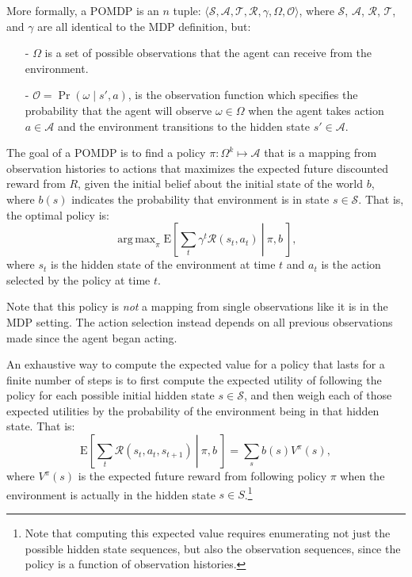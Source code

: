 \documentclass[11pt]{article}
\DeclareMathOperator*{\argmax}{arg\,max}
\begin{document}
More formally, a POMDP is an $n$ tuple: $\langle \mathcal{S},\mathcal{A},\mathcal{T},\mathcal{R}, \gamma, \Omega,\mathcal{O} \rangle$, where $\mathcal{S}$, $\mathcal{A}$, $\mathcal{R}$, $\mathcal{T}$, and $\gamma$ are all identical to the MDP definition, but:
\begin{itemize}
\item[-] $\Omega$ is a set of possible observations that the agent can receive from the environment.
\item[-] $\mathcal{O} = \Pr(\omega \mid s', a)$, is the observation function which specifies the probability that the agent will observe $\omega \in \Omega$ when the agent takes action $a \in \mathcal{A}$ and the environment transitions to the hidden state $s' \in \mathcal{A}$.
\end{itemize}

The goal of a POMDP is to find a policy $\pi : \Omega^k \mapsto \mathcal{A}$ that is a mapping from observation histories to actions that maximizes the expected future discounted reward from $R$, given the initial belief about the initial state of the world $b$, where $b(s)$ indicates the probability that environment is in state $s \in \mathcal{S}$. That is, the optimal policy is:
\begin{equation}
\argmax_\pi \left.\text{E}\left[\sum_t \gamma^t \mathcal{R}(s_t,a_t)\ \right|\ \pi, b\ \right],
\end{equation}
where $s_t$ is the hidden state of the environment at time $t$ and $a_t$ is the action selected by the policy at time $t$. 

Note that this policy is {\em not} a mapping from single observations like it is in the MDP setting. The action selection instead depends on all previous observations made since the agent began acting.

An exhaustive way to compute the expected value for a policy that lasts for a finite number of steps is to first compute the expected utility of following the policy for each possible initial hidden state $s \in \mathcal{S}$, and then weigh each of those expected utilities by the probability of the environment being in that hidden state. That is:
\begin{equation}
\left.\text{E}\left[\sum_t \mathcal{R}(s_t,a_t,s_{t+1})\ \right|\ \pi, b\ \right] = \sum_s b(s) V^\pi(s),
\end{equation}
where $V^\pi(s)$ is the expected future reward from following policy $\pi$ when the environment is actually in the hidden state $s \in S$.\footnote{Note that computing this expected value requires enumerating not just the possible hidden state sequences, but also the observation sequences, since the policy is a function of observation histories.}
\end{document}
